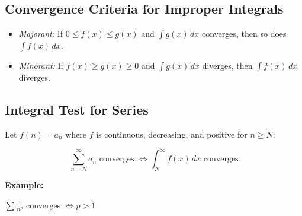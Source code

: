 \subsection{Convergence Criteria for Improper Integrals}

\begin{itemize}

    \item \emph{Majorant:} If \(0 \le f(x) \le g(x)\) and \(\int g(x)\,dx\) converges, then so does \(\int f(x)\,dx\).

    \item \emph{Minorant:} If \(f(x) \ge g(x) \ge 0\) and \(\int g(x)\,dx\) diverges, then \(\int f(x)\,dx\) diverges.

\end{itemize}

\subsection{Integral Test for Series}

Let \(f(n) = a_n\) where \(f\) is continuous, decreasing, and positive for \(n \ge N\):

\[
    \sum_{n=N}^\infty a_n \text{ converges } \iff \int_N^\infty f(x)\,dx \text{ converges}
\]

\textbf{Example:}

\(\sum \frac{1}{n^p}\) converges \(\iff p > 1\)

